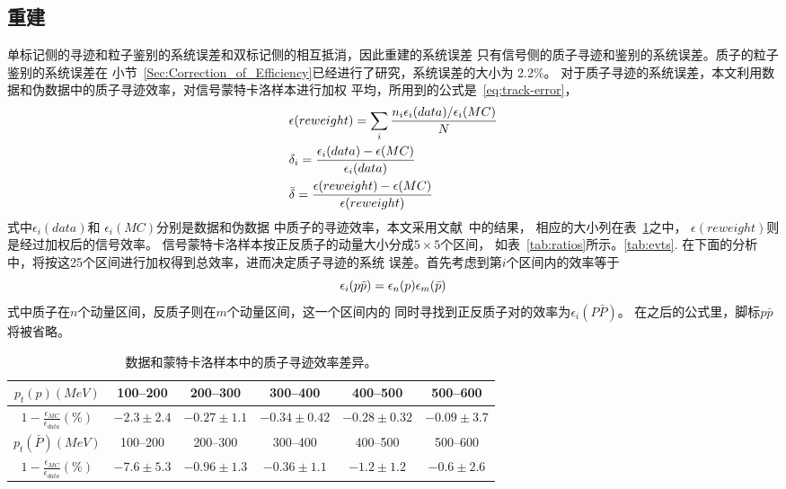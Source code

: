 \subsection{重建}
单标记侧的寻迹和粒子鉴别的系统误差和双标记侧的相互抵消，因此重建的系统误差
只有信号侧的质子寻迹和鉴别的系统误差。质子的粒子鉴别的系统误差在
小节~\ref{Sec:Correction_of_Efficiency}已经进行了研究，系统误差的大小为
2.2\%。
对于质子寻迹的系统误差，本文利用数据和伪数据中的质子寻迹效率，对信号蒙特卡洛样本进行加权
平均，所用到的公式是~\ref{eq:track-error}，
\begin{equation}
    \begin{aligned}
        \label{eq:track-error}
        &\epsilon(reweight) = \sum_{i}  \frac{n_{i} \epsilon_{i}(data) / 
        \epsilon_{i} (MC) }{N} \notag  \\
        & \delta_{i}  =  \frac{\epsilon_{i}(data) -
        \epsilon(MC)}{\epsilon_{i}(data)}  \notag  \\
        &\bar{\delta}  =  \frac{\epsilon(reweight) -
        \epsilon(MC)}
        {\epsilon (reweight)}
    \end{aligned}
\end{equation}
式中$\epsilon_{i}(data)$和
$\epsilon_{i}(MC)$分别是数据和伪数据 
中质子的寻迹效率，本文采用文献~\cite{HaoXq:ProtonPID}中的结果，
相应的大小列在表~\ref{tab:proton-efficiency}之中，
$\epsilon(reweight)$则是经过加权后的信号效率。
信号蒙特卡洛样本按正反质子的动量大小分成$5\times5$个区间，
如表~\ref{tab:ratios}所示。\ref{tab:evts}. 
在下面的分析中，将按这25个区间进行加权得到总效率，进而决定质子寻迹的系统
误差。首先考虑到第$i$个区间内的效率等于
\begin{equation}
    \epsilon_{i}(p\bar{p}) = \epsilon_{n}(p) \epsilon_{m}(\bar{p})
    \notag
\end{equation}
式中质子在$n$个动量区间，反质子则在$m$个动量区间，这一个区间内的
同时寻找到正反质子对的效率为$\epsilon_{i}(P\bar{P})$。
在之后的公式里，脚标$p\bar{p}$将被省略。
\begin{table}[htbp] %
    \caption{数据和蒙特卡洛样本中的质子寻迹效率差异。
    }%
    \label{tab:proton-efficiency}
    \begin{center}
        \begin{tabular} {c c c c c c}
            \toprule
            $p_{t}(p) (MeV)$  &  100--200 & 200--300 & 300--400 
            & 400--500 & 500--600 \\
            \midrule
            $1-  \frac{\epsilon_{MC}}{\epsilon_{data}}  (\%) $  &
            $ -2.3 \pm  2.4  $ & $ -0.27 \pm 1.1  $  &
            $ -0.34 \pm 0.42 $ & $ - 0.28 \pm 0.32 $ & 
            $ -0.09 \pm 3.7 $  \\
            \midrule
            $p_{t}(\bar{P}) (MeV)$  &  100--200 & 200--300 
            & 300--400 & 400--500 & 500--600 \\
            \midrule
            $1-  \frac{\epsilon_{MC}}{\epsilon_{data}} (\%)$  &
            $ -7.6 \pm  5.3  $ & $ -0.96 \pm 1.3  $  &
            $ -0.36 \pm 1.1 $ & $ - 1.2 \pm 1.2 $ & 
            $ -0.6 \pm 2.6 $ \\
            \bottomrule
        \end{tabular}
    \end{center}
\end{table}
